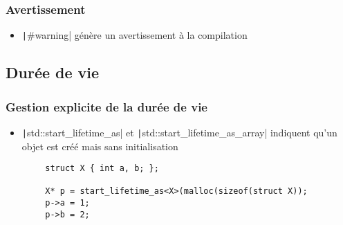 \documentclass[C++.tex]{subfiles}
\begin{document}
\begin{frame}[fragile]
	\frametitle{Avertissement}
	\begin{itemize}
		\item \texttt|#warning| génère un avertissement à la compilation
	\end{itemize}


\end{frame}

\subsection*{Durée de vie}
\begin{frame}[fragile]
	\frametitle{Gestion explicite de la durée de vie}
	\begin{itemize}
		\item \texttt|std::start_lifetime_as| et \texttt|std::start_lifetime_as_array| indiquent qu'un objet est créé mais sans initialisation
	\end{itemize}

	\begin{verbatim}
		struct X { int a, b; };

		X* p = start_lifetime_as<X>(malloc(sizeof(struct X));
		p->a = 1;
		p->b = 2;
	\end{verbatim}

\end{frame}
\end{document}

